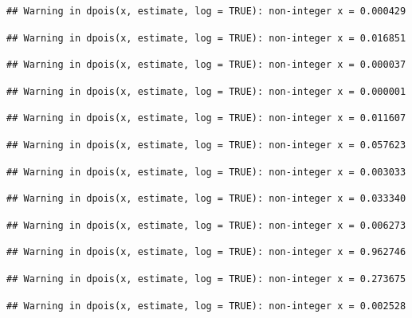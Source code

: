 \documentclass[]{article}
\begin{document}
\begin{verbatim}
## Warning in dpois(x, estimate, log = TRUE): non-integer x = 0.000429
\end{verbatim}

\begin{verbatim}
## Warning in dpois(x, estimate, log = TRUE): non-integer x = 0.016851
\end{verbatim}

\begin{verbatim}
## Warning in dpois(x, estimate, log = TRUE): non-integer x = 0.000037
\end{verbatim}

\begin{verbatim}
## Warning in dpois(x, estimate, log = TRUE): non-integer x = 0.000001
\end{verbatim}

\begin{verbatim}
## Warning in dpois(x, estimate, log = TRUE): non-integer x = 0.011607
\end{verbatim}

\begin{verbatim}
## Warning in dpois(x, estimate, log = TRUE): non-integer x = 0.057623
\end{verbatim}

\begin{verbatim}
## Warning in dpois(x, estimate, log = TRUE): non-integer x = 0.003033
\end{verbatim}

\begin{verbatim}
## Warning in dpois(x, estimate, log = TRUE): non-integer x = 0.033340
\end{verbatim}

\begin{verbatim}
## Warning in dpois(x, estimate, log = TRUE): non-integer x = 0.006273
\end{verbatim}

\begin{verbatim}
## Warning in dpois(x, estimate, log = TRUE): non-integer x = 0.962746
\end{verbatim}

\begin{verbatim}
## Warning in dpois(x, estimate, log = TRUE): non-integer x = 0.273675
\end{verbatim}

\begin{verbatim}
## Warning in dpois(x, estimate, log = TRUE): non-integer x = 0.002528
\end{verbatim}
\end{document}
